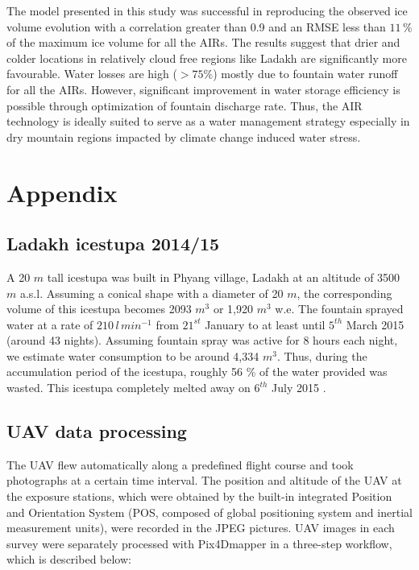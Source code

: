 \documentclass[utf8]{frontiersSCNS}
\begin{document}
The model presented in this study was successful in reproducing the observed ice volume evolution with a
correlation greater than 0.9 and an RMSE less than $11 \, \%$ of the maximum ice volume for all the AIRs. The
results suggest that drier and colder locations in relatively cloud free regions like Ladakh are significantly
more favourable. Water losses are high ($>75\%$) mostly due to fountain water runoff for all the AIRs. However,
significant improvement in water storage efficiency is possible through optimization of fountain discharge rate.
Thus, the AIR technology is ideally suited to serve as a water management strategy especially in dry mountain
regions impacted by climate change induced water stress.

\section{Appendix}

\subsection{Ladakh icestupa 2014/15} \label{sec:ladakhloss}

A 20 $m$ tall icestupa \citep{iceheight} was built in Phyang village, Ladakh at an altitude of 3500 $m$ a.s.l.
Assuming a conical shape with a diameter of 20 $m$, the corresponding volume of this icestupa becomes 2093 $m^3$ or
1,920 $m^3$ w.e. The fountain sprayed water at a rate of $210\, l\,min^{-1}$ \citep{waterinput} from $21^{st}$
January \citep{waterstart} to at least until $5^{th}$ March 2015 \citep{waterend} (around 43 nights). Assuming
fountain spray was active for 8 hours each night, we estimate water consumption to be around 4,334 $m^3$. Thus,
during the accumulation period of the icestupa, roughly 56 \% of the water provided was wasted.  This icestupa
completely melted away on $6^{th}$ July 2015 \citep{coneends}.

\subsection{UAV data processing} \label{sec:uav}
The UAV flew automatically along a predefined flight course and took photographs at a certain time interval. The
position and altitude of the UAV at the exposure stations, which were obtained by the built-in integrated
Position and Orientation System (POS, composed of global positioning system and inertial measurement units),
were recorded in the JPEG pictures. UAV images in each survey were separately processed with Pix4Dmapper in a
three-step workflow, which is described below:
\end{document}
